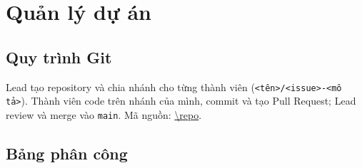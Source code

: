 \section{Quản lý dự án}


\subsection{Quy trình Git}
Lead tạo repository và chia nhánh cho từng thành viên (\texttt{<tên>/<issue>-<mô tả>}).
Thành viên code trên nhánh của mình, commit và tạo Pull Request; Lead review và merge vào \texttt{main}.
Mã nguồn: \url{\repo}.

\subsection{Bảng phân công}

